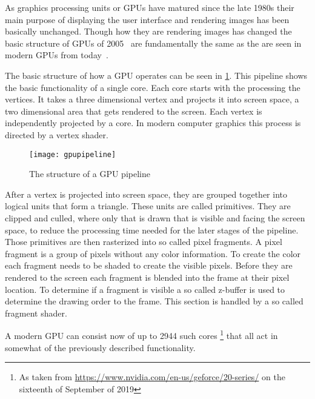 As graphics processing units or GPUs have matured since the late 1980s their main purpose of displaying the user interface and rendering images has been basically unchanged. Though how they are rendering images has changed the basic structure of GPUs of 2005~\cite{kilgariff2005geforce} are fundamentally the same as the are seen in modern GPUs from today~\cite{nvidia2018turing}.

The basic structure of how a GPU operates can be seen in \cref{img:gpuPipe}. This pipeline shows the basic functionality of a single core. Each core starts with the processing the vertices. It takes a three dimensional vertex and projects it into screen space, a two dimensional area that gets rendered to the screen. Each vertex is independently projected by a core. In modern computer graphics this process is directed by a vertex shader.

\begin{figure}[H]
	\centering
	\texttt{[image: gpupipeline]}
	\caption{The structure of a GPU pipeline}
	\label{img:gpuPipe}
\end{figure}

After a vertex is projected into screen space, they are grouped together into logical units that form a triangle. These units are called primitives. They are clipped and culled, where only that is drawn that is visible and facing the screen space, to reduce the processing time needed for the later stages of the pipeline. Those primitives are then rasterized into so called pixel fragments. A pixel fragment is a group of pixels without any color information. To create the color each fragment needs to be shaded to create the visible pixels. Before they are rendered to the screen each fragment is blended into the frame at their pixel location. To determine if a fragment is visible a so called z-buffer is used to determine the drawing order to the frame. This section is handled by a so called fragment shader. 

A modern GPU can consist now of up to 2944 such cores \footnote{As taken from \url{https://www.nvidia.com/en-us/geforce/20-series/} on the sixteenth of September of 2019} that all act in somewhat of the previously described functionality.
